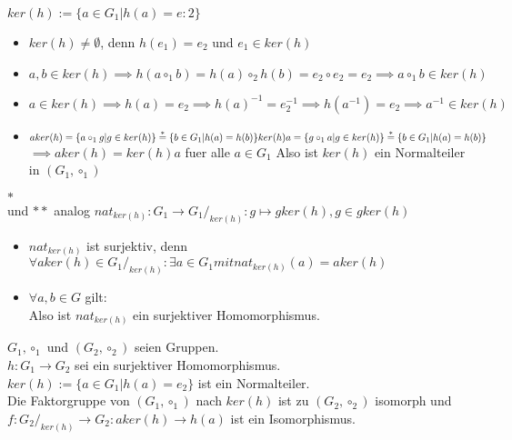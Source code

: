 \documentclass{../tudscript}
\begin{document}
  $ker(h) := \{a \in G_1 | h(a) = e:2\}$
  \begin{itemize}
  \item $ker(h) \neq \emptyset$, denn $h(e_1) = e_2$ und $e_1 \in ker(h)$
    \item $a,b \in ker(h) \implies h(a \circ_1 b) = h(a) \circ_2 h(b) =
        e_2 \circ e_2 = e_2 \implies a \circ_1 b \in ker(h)$
      \item $a \in ker(h) \implies h(a) = e_2 \implies h(a)^{-1} =
          e_2^{-1} \implies h(a^{-1})= e_2 \implies a^{-1} \in ker(h)$

\item $a ker(h) = \{a \circ_1 g | g \in ker(h)\} \overset{\ast}{=}\{b \in G_1 |
  h(a) = h(b)\} \\
  ker(h) a = \{g \circ_1 a | g \in ker(h)\} \overset{\ast}{=} \{b \in G_1 | h(a)
  = h(b)\}$\\
$\implies a ker(h) = ker(h)a$ fuer alle $a \in G_1$
Also ist $ker(h)$ ein Normalteiler in $(G_1, \circ_1)$
\end{itemize}
$\ast$\\
und
$\ast \ast$ analog
$nat_{ker(h)}: G_1 \rightarrow G_1/_{ker(h)}:g \mapsto g ker(h), g\in g ker(h)$
\begin{itemize}
\item $nat_{ker(h)}$ ist surjektiv, denn $\forall a ker(h) \in G_1/_{ker(h)}:
  \exists a\in G_1 mit  nat_{ker(h)} (a) = a ker(h)$
\item $\forall a,b \in G$ gilt: \\
  Also ist $nat_{ker(h)}$ ein surjektiver Homomorphismus.
\end{itemize}
$G_1, \circ_1$ und $(G_2,\circ_2)$ seien Gruppen.\\
$h:G_1 \rightarrow G_2$ sei ein surjektiver Homomorphismus.\\
$ker(h) := \{a \in G_1 | h(a) = e_2\}$ ist ein Normalteiler.\\
Die Faktorgruppe von $(G_1, \circ_1)$ nach $ker(h)$ ist zu $(G_2,\circ_2)$
isomorph und $f:G_2/_{ker(h)} \rightarrow G_2 : a ker(h) \rightarrow h(a)$ ist
ein Isomorphismus.
\end{document}
